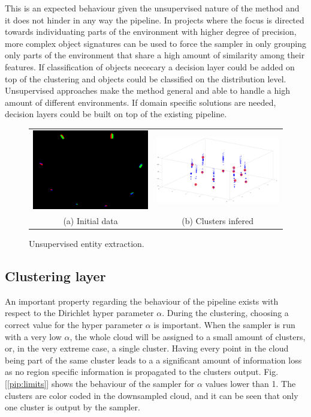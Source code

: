 \documentclass[twoside,hidelinks]{article}
\begin{document}
This is an expected behaviour given the unsupervised nature of the method and it does not hinder in any way the  pipeline. In projects where the focus is directed towards individuating parts of the environment with higher degree of precision, more complex object signatures can be used to force the sampler in only grouping only parts of the environment that share a high amount of similarity among their features. If classification of objects nececary a decision layer could be added on top of the clustering and objects could be classified on the distribution level. Unsupervised approaches make the method general and able to handle a high amount of different environments. If domain specific solutions are needed, decision layers could be built on top of the existing pipeline.


\begin{figure}[!ht]
\begin{tabular}{cc}
    \includegraphics[width=.5\textwidth]{8boxesData} &  \includegraphics[width=.5\textwidth]{8boxes} \\
  (a) Initial data  & (b) Clusters infered \\[6pt]
\end{tabular}
\caption{Unsupervised entity extraction.}
  \label{pip:beh}
\end{figure}


\subsection{Clustering layer}

An important property regarding the behaviour of the pipeline exists with respect to the Dirichlet hyper parameter $\alpha$. During the clustering, choosing a correct value for the hyper parameter $\alpha$ is important. When the sampler is run with a very low $\alpha$, the whole cloud will be assigned to a small amount of clusters, or, in the very extreme case, a single cluster. Having every point in the cloud being part of the same cluster leads to a a significant amount of information loss as no region specific information is propagated to the clusters output. Fig.[\ref{pip:limits}] shows the behaviour of the sampler for $\alpha$ values lower than 1. The clusters are color coded in the downsampled cloud, and it can be seen that only one cluster is output by the sampler.
\end{document}
